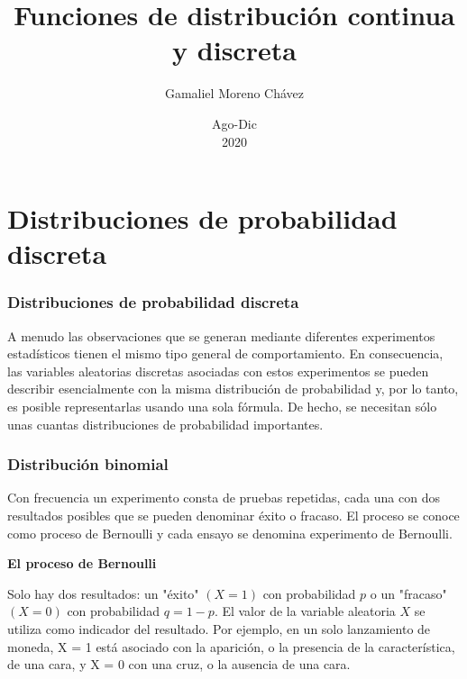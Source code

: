 \documentclass[spanish]{beamer}
\begin{document}
\title{Funciones de distribución continua y discreta}
\author{Gamaliel Moreno Chávez}
\date{Ago-Dic\\ 2020}%

\frame{\titlepage}
\section{Distribuciones de probabilidad discreta}

\begin{frame}
\frametitle{Distribuciones de probabilidad discreta}
A menudo las observaciones que se generan mediante diferentes experimentos estadísticos tienen el mismo tipo general de comportamiento. En consecuencia, las variables aleatorias discretas asociadas con estos experimentos se pueden describir esencialmente con la misma distribución de probabilidad y, por lo tanto, es posible representarlas usando una sola fórmula. De hecho, se necesitan sólo unas cuantas distribuciones de probabilidad importantes.

\end{frame}

\begin{frame}
\frametitle{Distribución binomial}
Con frecuencia un experimento consta de pruebas repetidas, cada una con dos resultados posibles que se pueden denominar éxito o fracaso. El proceso se conoce como proceso de Bernoulli y cada ensayo se denomina experimento de Bernoulli.


\textbf{El proceso de Bernoulli}

Solo hay dos resultados: un "éxito" $(X = 1)$ con probabilidad $p$ o un "fracaso" $(X = 0)$ con probabilidad $q = 1 - p$. El valor de la variable aleatoria $X$ se utiliza como indicador del resultado. Por ejemplo, en un solo lanzamiento de moneda, X = 1 está asociado con la aparición, o la presencia de la característica, de una cara, y X = 0 con una cruz, o la ausencia de una cara.

\end{frame}
\end{document}
